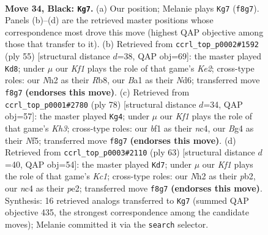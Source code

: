 \documentclass[11pt]{article}
\begin{document}
\clearpage

\begin{figure}[p]\centering
\begin{subfigure}{0.46\textwidth}\centering
\resizebox{\linewidth}{!}{%
\newchessgame
\chessboard[
  setfen={1R3k2/5p2/p1p5/P3P1p1/1PN3b1/8/5K1n/b4B2 b - - 2 34},
  showmover=false,
  pgfstyle=straightmove, color=movearrow, markmove={f8-g7}
]}
\caption{}
\end{subfigure}\hfill
\begin{subfigure}{0.46\textwidth}\centering
\resizebox{\linewidth}{!}{%
\newchessgame
\chessboard[
  setfen={1rb5/p3k1p1/3n1p2/K6p/1PB5/4R1P1/3NP2P/8 b - - 2 28},
  showmover=false,
  pgfstyle=straightmove, color=movearrow, markmove={e7-d8}
]}
\caption{}
\end{subfigure}
\\[4pt]
\begin{subfigure}{0.46\textwidth}\centering
\resizebox{\linewidth}{!}{%
\newchessgame
\chessboard[
  setfen={4RB2/5ppk/1b6/p4N1P/2n2P2/2r4K/8/8 w - - 4 40},
  showmover=false,
  pgfstyle=straightmove, color=movearrow, markmove={h3-g4}
]}
\caption{}
\end{subfigure}\hfill
\begin{subfigure}{0.46\textwidth}\centering
\resizebox{\linewidth}{!}{%
\newchessgame
\chessboard[
  setfen={2k2R2/1p6/2p4p/p3bP2/P7/3B4/KP2P3/3r4 b - - 2 32},
  showmover=false,
  pgfstyle=straightmove, color=movearrow, markmove={c8-d7}
]}
\caption{}
\end{subfigure}
\caption{\textbf{Move 34, Black: \texttt{Kg7}.} (a) Our position; Melanie plays \texttt{Kg7} (\texttt{f8g7}). Panels (b)--(d) are the retrieved master positions whose correspondence most drove this move (highest QAP objective among those that transfer to it). (b) Retrieved from \texttt{ccrl\_top\_p0002\#1592} (ply 55) [structural distance $d$=38, QAP obj=69]: the master played \texttt{Kd8}; under $\mu$ our \emph{Kf1} plays the role of that game's \emph{Ke2}; cross-type roles: our \emph{N}h2 as their \emph{R}b8, our \emph{B}a1 as their \emph{N}d6; transferred move \texttt{f8g7} \textbf{(endorses this move)}. (c) Retrieved from \texttt{ccrl\_top\_p0001\#2780} (ply 78) [structural distance $d$=34, QAP obj=57]: the master played \texttt{Kg4}; under $\mu$ our \emph{Kf1} plays the role of that game's \emph{Kh3}; cross-type roles: our \emph{b}f1 as their \emph{n}c4, our \emph{B}g4 as their \emph{N}f5; transferred move \texttt{f8g7} \textbf{(endorses this move)}. (d) Retrieved from \texttt{ccrl\_top\_p0003\#2110} (ply 63) [structural distance $d$=40, QAP obj=54]: the master played \texttt{Kd7}; under $\mu$ our \emph{Kf1} plays the role of that game's \emph{Kc1}; cross-type roles: our \emph{N}h2 as their \emph{p}b2, our \emph{n}c4 as their \emph{p}e2; transferred move \texttt{f8g7} \textbf{(endorses this move)}. Synthesis: 16 retrieved analogs transferred to \texttt{Kg7} (summed QAP objective 435, the strongest correspondence among the candidate moves); Melanie committed it via the \texttt{search} selector.}
\label{fig:thought-m67}
\end{figure}
\end{document}
